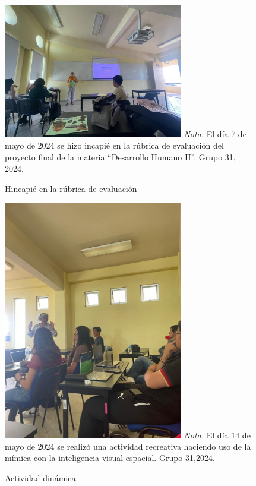 \begin{figure}
    \caption{Hincapi\'e en la r\'ubrica de evaluaci\'on\label{fig:No.4}}
    \includegraphics[width=0.7\textwidth]{./assets/img/imagen4DH.jpeg}
	\textit{Nota.} El día 7 de mayo de 2024 se hizo incapi\'e en la r\'ubrica de evaluaci\'on del proyecto final de la materia ``Desarrollo Humano II''. Grupo 31, 2024.
\end{figure}

\begin{figure}
    \caption{Actividad din\'amica\label{fig:No.5}}
    \includegraphics[width=0.7\textwidth]{./assets/img/imagen5DH.jpeg}
	\textit{Nota.} El d\'ia 14 de mayo de 2024 se realiz\'o una actividad recreativa haciendo uso de la m\'imica con la inteligencia visual-espacial. Grupo 31,2024.
\end{figure}

